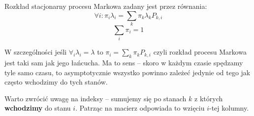 \begin{theorem}[strona 228 P\&C]
	Rozkład stacjonarny procesu Markowa zadany jest przez równania:
	\[
		\forall i: \pi_i \lambda_i = \sum_k \pi_k \lambda_k P_{k, i}
	\]
	\[
		\sum_i \pi_i = 1
	\]
\end{theorem}

W szczególności jeśli \( \forall_i \lambda_i = \lambda \) to \( \pi_i = \sum_k \pi_k P_{k, i} \)
czyli rozkład procesu Markowa jest taki sam jak jego łańcucha. Ma to sens -- skoro w każdym czasie spędzamy tyle samo czasu,
to asymptotycznie wszystko powinno zależeć jedynie od tego jak często wchodzimy do tych stanów.

Warto zwrócić uwagę na indeksy -- sumujemy się po stanach \( k \) z których \textbf{wchodzimy} do stanu \( i \). Patrząc na macierz odpowiada to wzięciu \( i \)-tej kolumny.

